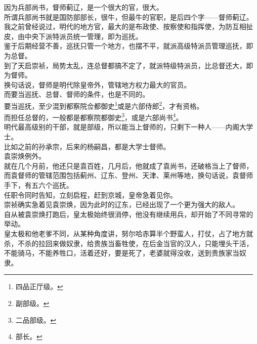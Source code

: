 \begin{multicols}{\theparacolNo}
因为兵部尚书，督师蓟辽，是一个很大的官，很大。\\

所谓兵部尚书就是国防部部长，很牛，但最牛的官职，是后四个字——督师蓟辽。\\

我之前曾经说过，明代的地方官，最大的是布政使、按察使和指挥使，为防互相扯皮，由中央下派特派员统一管理，即为巡抚。\\

鉴于后期经营不善，巡抚只管一个地方，也摆不平，就派高级特派员管理巡抚，即为总督。\\

到了天启崇祯，局势太乱，连总督都搞不定了，就派特级特派员，比总督还大，即为督师。\\

换句话说，督师是明代除皇帝外，管辖地方权力最大的官员。\\

而要当巡抚、总督、督师的条件，也是不同的。\\

要当巡抚，至少混到都察院佥都御史\footnote{四品正厅级。}或是六部侍郎\footnote{副部级。}，才有资格。\\

而担任总督的，一般都是都察院都御史\footnote{二品部级。}，或是六部尚书\footnote{部长。}。\\

明代最高级别的干部，就是部级，所以能当上督师的，只剩下一种人——内阁大学士。\\

比如之前的孙承宗，后来的杨嗣昌，都是大学士督师。\\

袁崇焕例外。\\

就在几个月前，他还只是袁百姓，几月后，他就成了袁尚书，还破格当上了督师，而袁督师的管辖范围包括蓟州、辽东、登州、天津、莱州等地，换句话说，袁督师手下，有五六个巡抚。\\

任职令同时告知，立刻启程，赶到京城，皇帝急着见你。\\

崇祯确实急着见袁崇焕，因为此时的辽东，已经出现了一个更为强大的敌人。\\

自从被袁崇焕打跑后，皇太极始终很消停，他没有继续用兵，却开始了不同寻常的举动。\\

皇太极和他老爹不同，从某种角度讲，努尔哈赤算半个野蛮人，打仗，占了地方就杀，不杀的拉回来做奴隶，给贵族当畜牲使，在后金当官的汉人，只能埋头干活，不能骑马，不能养牲口，活着还好，要是死了，老婆就得没收，送到贵族家当奴隶。\\


\end{multicols}
